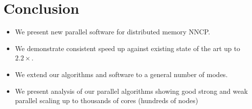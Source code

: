 \section{Conclusion} \label{sec:conclusion}
\begin{itemize}
	\item We present new parallel software for distributed memory NNCP.
	\item We demonstrate consistent speed up against existing state of the art up to $2.2\times$.
	\item We extend our algorithms and software to a general number of modes.
	\item We present analysis of our parallel algorithms showing good strong and weak parallel scaling up to thousands of cores (hundreds of nodes)
\end{itemize}